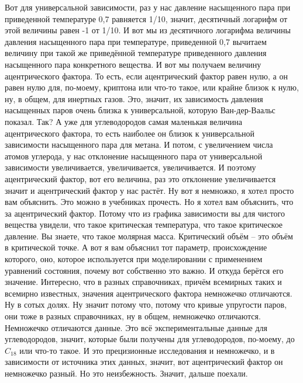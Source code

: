 \documentclass[main.tex]{subfiles}
\begin{document}
Вот для универсальной зависимости, раз у нас давление насыщенного пара при приведенной температуре 0,7 равняется 1/10, значит, десятичный логарифм от этой величины равен -1 от
1/10.
И вот мы из десятичного логарифма величины давления насыщенного пара при температуре, приведенной 0,7 вычитаем величину при такой же приведённой температуре приведенного давления насыщенного пара конкретного вещества.
И вот мы получаем величину ацентрического фактора.
То есть, если ацентрический фактор равен нулю, а он равен нулю для, по-моему, криптона или что-то такое, или крайне близок к нулю, ну, в общем, для инертных газов.
Это, значит, их зависимость давления насыщенных паров очень близка к универсальной, которую Ван-дер-Ваальс показал.
Так?
А уже для углеводородов самая маленькая величина ацентрического фактора, то есть наиболее он близок к универсальной зависимости насыщенного пара для метана.
И потом, с увеличением числа атомов углерода, у нас отклонение насыщенного пара от универсальной зависимости увеличивается, увеличивается, увеличивается.
И поэтому ацентрический фактор, вот его величина, раз это отклонение увеличивается значит и ацентрический фактор у нас растёт.
Ну вот я немножко, я хотел просто вам объяснить.
Это можно в учебниках прочесть.
Но я хотел вам объяснить, что за ацентрический фактор.
Потому что из графика зависимости вы для чистого вещества увидели, что такое критическая температура, что такое критическое давление.
Вы знаете, что такое молярная масса.
Критический объём -- это объём в критической точке.
А вот я вам объяснил тот параметр, происхождение которого, оно, которое используется при моделировании с применением уравнений состояния, почему вот собственно это важно.
И откуда берётся его значение.
Интересно, что в разных справочниках, причём всемирных таких и всемирно известных, значения ацентрического фактора немножечко отличаются.
Ну в сотых долях.
Ну значит потому что, потому что кривые упругости паров, они тоже в разных справочниках, ну в общем, немножечко отличаются.
Немножечко отличаются данные.
Это всё экспериментальные данные для углеводородов, значит, которые были получены для углеводородов, по-моему, до $C_{18}$ или что-то такое.
И это прецизионные исследования и немножечко, и в зависимости от источника этих данных, значит, вот ацентрический фактор он немножечко разный.
Но это неизбежность.
Значит, дальше поехали.
\end{document}
